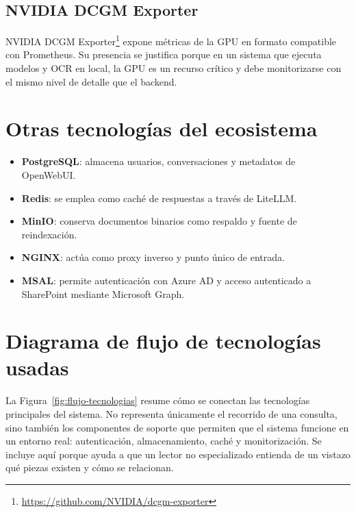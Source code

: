 \subsection{NVIDIA DCGM Exporter}

NVIDIA DCGM Exporter\footnote{\url{https://github.com/NVIDIA/dcgm-exporter}} expone métricas de la GPU en formato compatible con Prometheus. Su presencia se justifica porque en un sistema que ejecuta modelos y OCR en local, la GPU es un recurso crítico y debe monitorizarse con el mismo nivel de detalle que el backend.

\section{Otras tecnologías del ecosistema}
\label{sec:otras-tecnologias}

\begin{itemize}
    \item \textbf{PostgreSQL}: almacena usuarios, conversaciones y metadatos de OpenWebUI.
    \item \textbf{Redis}: se emplea como caché de respuestas a través de LiteLLM.
    \item \textbf{MinIO}: conserva documentos binarios como respaldo y fuente de reindexación.
    \item \textbf{NGINX}: actúa como proxy inverso y punto único de entrada.
    \item \textbf{MSAL}: permite autenticación con Azure AD y acceso autenticado a SharePoint mediante Microsoft Graph.
\end{itemize}

\section{Diagrama de flujo de tecnologías usadas}
\label{sec:diagrama-flujo}

La Figura~\ref{fig:flujo-tecnologias} resume cómo se conectan las tecnologías principales del sistema. No representa únicamente el recorrido de una consulta, sino también los componentes de soporte que permiten que el sistema funcione en un entorno real: autenticación, almacenamiento, caché y monitorización. Se incluye aquí porque ayuda a que un lector no especializado entienda de un vistazo qué piezas existen y cómo se relacionan.

